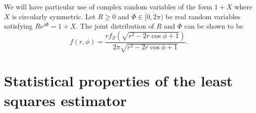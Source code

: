 \documentclass{article}
\begin{document}
We will have particular use of complex random variables of the form $1 + X$ where $X$ is circularly symmetric.  Let $R \geq 0$ and $\Phi \in [0,2\pi)$ be real random variables satisfying $R e^{j\Phi} = 1 + X$.  The joint distribution of $R$ and $\Phi$ can be shown to be
\[
f(r,\phi) = \frac{r f_Z(\sqrt{r^2 - 2r\cos\phi + 1})}{2\pi\sqrt{r^2 - 2r\cos\phi + 1}}.
\]







\section{Statistical properties of the least squares estimator}\label{sec:stat-prop-least}
\end{document}
